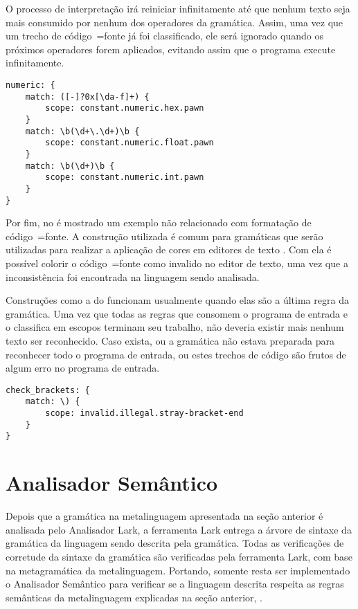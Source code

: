 O processo de interpretação irá reiniciar infinitamente até que nenhum texto seja mais consumido por nenhum dos operadores da gramática.
Assim,
uma vez que um trecho de código~=fonte já foi classificado,
ele será ignorado quando os próximos operadores forem aplicados,
evitando assim que o programa execute infinitamente.
\begin{lstlisting}[caption={Exemplo de Gramática -- Tipos numéricos},label={exemploDeGramaticaPawn4},style=yaml_style]
numeric: {
    match: ([-]?0x[\da-f]+) {
        scope: constant.numeric.hex.pawn
    }
    match: \b(\d+\.\d+)\b {
        scope: constant.numeric.float.pawn
    }
    match: \b(\d+)\b {
        scope: constant.numeric.int.pawn
    }
}
\end{lstlisting}

Por fim,
no  é mostrado um exemplo não relacionado com formatação de código~=fonte.
A construção utilizada é comum para gramáticas que serão utilizadas para realizar a aplicação de cores em editores de texto \cite{vsCodeSyntaxHighlighthing}.
Com ela é possível colorir o código~=fonte como invalido no editor de texto,
uma vez que a inconsistência foi encontrada na linguagem sendo analisada.

Construções como a do  funcionam usualmente quando elas são a última regra da gramática.
Uma vez que todas as regras que consomem o programa de entrada e
o classifica em escopos terminam seu trabalho,
não deveria existir mais nenhum texto ser reconhecido.
Caso exista,
ou a gramática não estava preparada para reconhecer todo o programa de entrada,
ou estes trechos de código são frutos de algum erro no programa de entrada.
\begin{lstlisting}[caption={Exemplo de Gramática -- Reconhecimento de Erros},label={exemploDeGramaticaPawn5},style=yaml_style]
check_brackets: {
    match: \) {
        scope: invalid.illegal.stray-bracket-end
    }
}
\end{lstlisting}


\section{Analisador Semântico}

Depois que a gramática na metalinguagem apresentada na seção anterior é analisada pelo Analisador Lark,
a ferramenta Lark entrega a árvore de sintaxe da gramática da linguagem sendo descrita pela gramática.
Todas as verificações de corretude da sintaxe da gramática são verificadas pela ferramenta Lark,
com base na metagramática da metalinguagem.
Portando,
somente resta ser implementado o Analisador Semântico para verificar se a linguagem descrita respeita as regras semânticas da metalinguagem explicadas na seção anterior,
.

